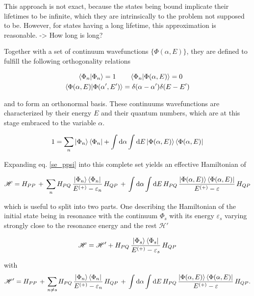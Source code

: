 This approach is not exact, because the states being bound implicate
their lifetimes to be infinite, which they are intrinsically
to the problem not supposed to be. However, for states having a long lifetime,
this approximation is reasonable. -> How long is long?

Together with a set of continuum wavefunctions $\{\Phi(\alpha,E)\}$, they are
defined to fulfill the following orthogonality relations

\begin{align}
  \braket{\Phi_n|\Phi_n} = 1 \quad  & \quad \braket{\Phi_n|\Phi(\alpha,E)} = 0\\
  \braket{\Phi(\alpha,E)|\Phi(\alpha',E')} & = \delta(\alpha-\alpha') \delta(E-E')
\end{align}

and to form an orthonormal basis. These continuums wavefunctions are characterized
by their energy $E$ and their quantum numbers, which are at this stage embraced
to the variable $\alpha$.

\begin{equation}
  1 = \sum\limits_n \ket{\Phi_n}\bra{\Phi_n} + \int \mathrm{d}\alpha \int \mathrm{d}E
      \ket{\Phi(\alpha,E)}\bra{\Phi(\alpha,E)} \label{feshbach_1}
\end{equation}

Expanding eq. \ref{se_ppsi} into this complete set yields an effective Hamiltonian
of

\begin{equation}
  \mathscr{H} = H_{PP}\, + \,
  \sum\limits_n H_{PQ} \,\frac{\ket{\Phi_n}\bra{\Phi_n}}{E^{(+)}-\varepsilon_n}\, H_{QP} \,+\,
  \int \mathrm{d}\alpha \int\mathrm{d}E \,H_{PQ} \,
  \frac{\ket{\Phi(\alpha,E)}\bra{\Phi(\alpha,E)}}{E^{(+)}-\varepsilon} \, H_{QP}
\end{equation}

which is useful to split into two parts. One describing the Hamiltonian of the
initial state being in resonance with the continuum $\Phi_s$ with its energy
$\varepsilon_s$ varying strongly close to the resonance energy and the rest
$\mathscr{H}'$

\begin{equation}
  \mathscr{H} = \mathscr{H}' + H_{PQ} \,\frac{\ket{\Phi_s}\bra{\Phi_s}}{E^{(+)}-\varepsilon_s}\, H_{QP}
\end{equation}

with
\begin{equation}
  \mathscr{H}' = H_{PP}\, + \,
  \sum\limits_{n\ne s} H_{PQ} \,\frac{\ket{\Phi_n}\bra{\Phi_n}}{E^{(+)}-\varepsilon_n}
  \, H_{QP} \,+\,
  \int \mathrm{d}\alpha \int\mathrm{d}E \,H_{PQ} \,
  \frac{\ket{\Phi(\alpha,E)}\bra{\Phi(\alpha,E)}}{E^{(+)}-\varepsilon} \, H_{QP} .
\end{equation}

